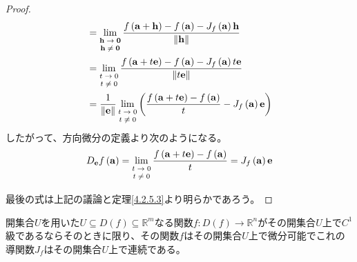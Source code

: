 \documentclass[dvipdfmx]{jsarticle}
\begin{document}
\begin{proof}
\begin{align*}
&= \lim_{\scriptsize \begin{matrix}
\mathbf{h} \rightarrow \mathbf{0} \\
\mathbf{h} \neq \mathbf{0} \\
\end{matrix}}\frac{f\left( \mathbf{a} + \mathbf{h} \right) - f\left( \mathbf{a} \right) - J_{f}\left( \mathbf{a} \right)\mathbf{h}}{\left\| \mathbf{h} \right\|}\\
&= \lim_{\scriptsize \begin{matrix}
t \rightarrow 0 \\
t \neq 0 \\
\end{matrix}}\frac{f\left( \mathbf{a} + t\mathbf{e} \right) - f\left( \mathbf{a} \right) - J_{f}\left( \mathbf{a} \right)t\mathbf{e}}{\left\| t\mathbf{e} \right\|}\\
&= \frac{1}{\left\| \mathbf{e} \right\|}\lim_{\scriptsize \begin{matrix}
t \rightarrow 0 \\
t \neq 0 \\
\end{matrix}}\left( \frac{f\left( \mathbf{a} + t\mathbf{e} \right) - f\left( \mathbf{a} \right)}{t} - J_{f}\left( \mathbf{a} \right)\mathbf{e} \right)
\end{align*}
したがって、方向微分の定義より次のようになる。
\begin{align*}
D_{\mathbf{e}}f\left( \mathbf{a} \right) = \lim_{\scriptsize \begin{matrix}
t \rightarrow 0 \\
t \neq 0 \\
\end{matrix}}\frac{f\left( \mathbf{a} + t\mathbf{e} \right) - f\left( \mathbf{a} \right)}{t} = J_{f}\left( \mathbf{a} \right)\mathbf{e}
\end{align*}\par
最後の式は上記の議論と定理\ref{4.2.5.3}より明らかであろう。
\end{proof}
\begin{thm}\label{4.2.6.5}
開集合$U$を用いた$U \subseteq D(f) \subseteq \mathbb{R}^{m}$なる関数$f:D(f) \rightarrow \mathbb{R}^{n}$がその開集合$U$上で$C^{1}$級であるならそのときに限り、その関数$f$はその開集合$U$上で微分可能でこれの導関数$J_{f}$はその開集合$U$上で連続である。
\end{thm}
\end{document}
